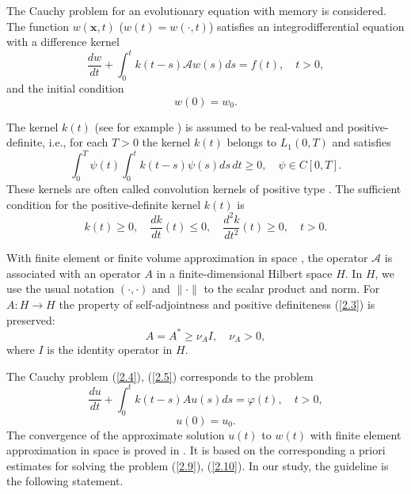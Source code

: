 \documentclass[3p]{elsarticle}
\numberwithin{equation}{section}
\begin{document}
The Cauchy problem for an evolutionary equation with memory is considered.
The function $w(\bm x,t)$ ($w(t) = w(\cdot, t)$) satisfies an integrodifferential equation with a difference kernel
\begin{equation}\label{2.4}
 \frac{d w}{d t} + \int_{0}^{t} k(t-s)  \mathcal{A} w(s) d s = f(t),
 \quad t > 0 ,  
\end{equation} 
and the initial condition
\begin{equation}\label{2.5}
 w(0) = w_0 .
\end{equation} 

The kernel $k(t)$  (see for example \cite{mclean1993numerical,mclean1996discretization}) is assumed to be real-valued and
positive-definite, i.e., for each $T > 0$ the kernel $k(t)$ belongs to $L_1(0, T)$ and satisfies
\begin{equation}\label{2.6}
 \int_{0}^{T} \psi(t) \int_{0}^{t} k(t-s) \psi(s) d s \, d t \geq 0,
 \quad \psi \in C[0,T] .
\end{equation} 
These kernels are often called convolution kernels of positive type \cite{gripenberg1990volterra}.
The sufficient condition for the positive-definite kernel $k(t)$ \cite{halanay1965asymptotic} is 
\begin{equation}\label{2.7}
 k(t) \geq 0,
 \quad \frac{d k}{d t}  (t) \leq 0,
 \quad \frac{d^2 k}{d t^2}  (t) \geq 0,
 \quad t > 0 . 
\end{equation} 

With finite element or finite volume approximation in space \cite{KnabnerAngermann2003, QuarteroniValli1994}, the operator
$\mathcal {A}$ is associated with an operator $A$ in a finite-dimensional Hilbert space $H$.
In $H$, we use the usual notation $(\cdot, \cdot)$ and $\|\cdot\|$ to the scalar product and norm.
For $A: H \rightarrow H$ the property of self-adjointness and positive definiteness (\ref{2.3}) is preserved:
\begin{equation}\label{2.8}
  A = A^* \geq \nu_A  I,
  \quad \nu_A   > 0 ,    
\end{equation} 
where $I$ is the identity operator in $H$.

The Cauchy problem (\ref{2.4}), (\ref{2.5}) corresponds to the problem
\begin{equation}\label{2.9}
 \frac{d u}{d t} + \int_{0}^{t} k(t-s)  A u(s) d s = \varphi (t),
 \quad t > 0 ,  
\end{equation} 
\begin{equation}\label{2.10}
 u(0) = u_0 .
\end{equation} 
The convergence of the approximate solution $ u (t) $ to $ w (t) $ with finite element approximation in space is proved in \cite{mclean1993numerical}.
It is based on the corresponding a priori estimates for solving the problem (\ref{2.9}), (\ref{2.10}).
In our study, the guideline is the following statement.
\end{document}

